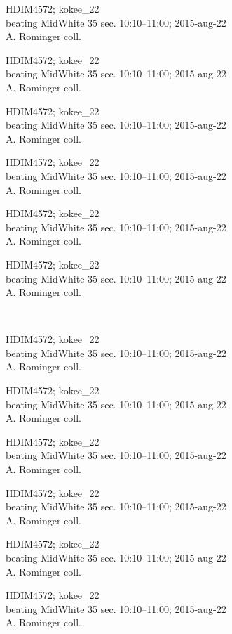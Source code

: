 \documentclass[2pt]{extarticle}
\begin{document}
\noindent
\parbox{0.16\textwidth}{\tiny \raggedright \rule[-0.3\baselineskip]{0pt}{10pt}HDIM4572; kokee\_22\\ beating MidWhite 35 sec. 10:10--11:00; 2015-aug-22\\ A. Rominger coll.}
\parbox{0.16\textwidth}{\tiny \raggedright \rule[-0.3\baselineskip]{0pt}{10pt}HDIM4572; kokee\_22\\ beating MidWhite 35 sec. 10:10--11:00; 2015-aug-22\\ A. Rominger coll.}
\parbox{0.16\textwidth}{\tiny \raggedright \rule[-0.3\baselineskip]{0pt}{10pt}HDIM4572; kokee\_22\\ beating MidWhite 35 sec. 10:10--11:00; 2015-aug-22\\ A. Rominger coll.}
\parbox{0.16\textwidth}{\tiny \raggedright \rule[-0.3\baselineskip]{0pt}{10pt}HDIM4572; kokee\_22\\ beating MidWhite 35 sec. 10:10--11:00; 2015-aug-22\\ A. Rominger coll.}
\parbox{0.16\textwidth}{\tiny \raggedright \rule[-0.3\baselineskip]{0pt}{10pt}HDIM4572; kokee\_22\\ beating MidWhite 35 sec. 10:10--11:00; 2015-aug-22\\ A. Rominger coll.}
\parbox{0.16\textwidth}{\tiny \raggedright \rule[-0.3\baselineskip]{0pt}{10pt}HDIM4572; kokee\_22\\ beating MidWhite 35 sec. 10:10--11:00; 2015-aug-22\\ A. Rominger coll.} \\ 
\vspace{0.001in} 

\noindent
\parbox{0.16\textwidth}{\tiny \raggedright \rule[-0.3\baselineskip]{0pt}{10pt}HDIM4572; kokee\_22\\ beating MidWhite 35 sec. 10:10--11:00; 2015-aug-22\\ A. Rominger coll.}
\parbox{0.16\textwidth}{\tiny \raggedright \rule[-0.3\baselineskip]{0pt}{10pt}HDIM4572; kokee\_22\\ beating MidWhite 35 sec. 10:10--11:00; 2015-aug-22\\ A. Rominger coll.}
\parbox{0.16\textwidth}{\tiny \raggedright \rule[-0.3\baselineskip]{0pt}{10pt}HDIM4572; kokee\_22\\ beating MidWhite 35 sec. 10:10--11:00; 2015-aug-22\\ A. Rominger coll.}
\parbox{0.16\textwidth}{\tiny \raggedright \rule[-0.3\baselineskip]{0pt}{10pt}HDIM4572; kokee\_22\\ beating MidWhite 35 sec. 10:10--11:00; 2015-aug-22\\ A. Rominger coll.}
\parbox{0.16\textwidth}{\tiny \raggedright \rule[-0.3\baselineskip]{0pt}{10pt}HDIM4572; kokee\_22\\ beating MidWhite 35 sec. 10:10--11:00; 2015-aug-22\\ A. Rominger coll.}
\parbox{0.16\textwidth}{\tiny \raggedright \rule[-0.3\baselineskip]{0pt}{10pt}HDIM4572; kokee\_22\\ beating MidWhite 35 sec. 10:10--11:00; 2015-aug-22\\ A. Rominger coll.} \\ 
\vspace{0.001in} 
\end{document}
